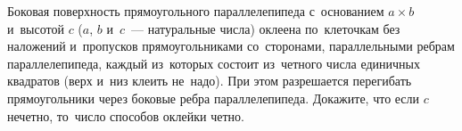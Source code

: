\begin{problems}

\item
Боковая поверхность прямоугольного параллелепипеда с~основанием $a \times b$
и~высотой $c$ ($a$, $b$ и~$c$~--- натуральные числа) оклеена по~клеточкам без
наложений и~пропусков прямоугольниками со~сторонами, параллельными ребрам
параллелепипеда, каждый из~которых состоит из~четного числа единичных квадратов
(верх и~низ клеить не~надо).
При этом разрешается перегибать прямоугольники через боковые ребра
параллелепипеда.
Докажите, что если $c$ нечетно, то~число способов оклейки четно.

\end{problems}

